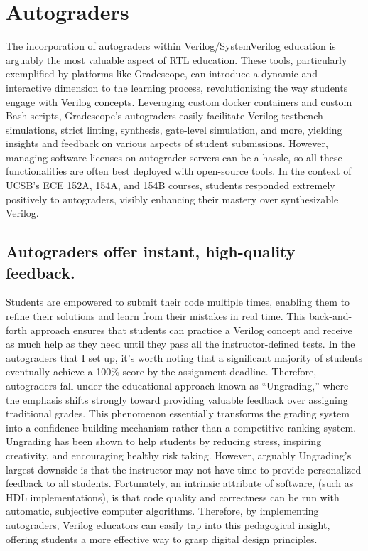 
\chapter{Autograders}
\label{chapter:autograders}

The incorporation of autograders within Verilog/SystemVerilog education is arguably the most valuable aspect of RTL education. These tools, particularly exemplified by platforms like Gradescope, can introduce a dynamic and interactive dimension to the learning process, revolutionizing the way students engage with Verilog concepts. Leveraging custom docker containers and custom Bash scripts, Gradescope's autograders easily facilitate Verilog testbench simulations, strict linting, synthesis, gate-level simulation, and more, yielding insights and feedback on various aspects of student submissions. However, managing software licenses on autograder servers can be a hassle, so all these functionalities are often best deployed with open-source tools. In the context of UCSB's ECE 152A, 154A, and 154B courses, students responded extremely positively to autograders, visibly enhancing their mastery over synthesizable Verilog.

\section{Autograders offer instant, high-quality feedback.}

Students are empowered to submit their code multiple times, enabling them to refine their solutions and learn from their mistakes in real time. This back-and-forth approach ensures that students can practice a Verilog concept and receive as much help as they need until they pass all the instructor-defined tests. In the autograders that I set up, it's worth noting that a significant majority of students eventually achieve a 100\% score by the assignment deadline. Therefore, autograders fall under the educational approach known as \enquote{Ungrading,} where the emphasis shifts strongly toward providing valuable feedback over assigning traditional grades. This phenomenon essentially transforms the grading system into a confidence-building mechanism rather than a competitive ranking system. Ungrading has been shown to help students by reducing stress, inspiring creativity, and encouraging healthy risk taking. \cite{kohn:book, blum:article} However, arguably Ungrading's largest downside is that the instructor may not have time to provide personalized feedback to all students. Fortunately, an intrinsic attribute of software, (such as HDL implementations), is that code quality and correctness can be run with automatic, subjective computer algorithms. Therefore, by implementing autograders, Verilog educators can easily tap into this pedagogical insight, offering students a more effective way to grasp digital design principles.

